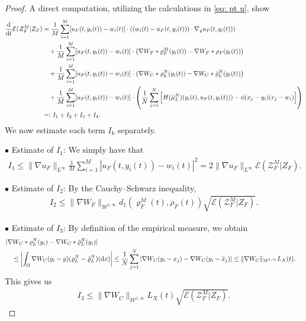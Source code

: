 \documentclass[10pt, reqno]{amsart}
\theoremstyle{definition}
\theoremstyle{remark}
\numberwithin{equation}{section}
\newcommand{\dx}{\textnormal{d}x}
\newcommand{\ddt}{\frac{\textnormal{d}}{\textnormal{d}t}}
\newcommand{\calE}{\mathcal E}
\newcommand{\calW}{\mathcal W}
\newcommand{\calZ}{\mathcal Z}
\begin{document}
\begin{proof}
A direct computation, utilizing the calculations in \eqref{eq: pt u}, show
\begin{align*}
   \ddt \calE(\calZ_F^M| Z_F)  
    &= \frac{1}{M}\sum_{i=1}^M [u_F(t,y_i(t))-w_i(t)]\cdot\left( (w_i(t) - u_F(t,y_i(t)) ) \cdot \nabla_y u_F(t,y_i(t))  \right)\\
    &\quad + \frac{1}{M}\sum_{i=1}^M [u_F(t,y_i(t)) - w_i(t)] \cdot \left(\nabla W_F * \varrho_F^M(y_i(t)) - \nabla W_F * \rho_F(y_i(t)) \right) \\
    &\quad + \frac{1}{M}\sum_{i=1}^M [u_F(t,y_i(t)) - w_i(t)] \cdot \left(\nabla W_C * \varrho_L^N(y_i(t)) - \nabla W_C * \bar \varrho_L^N(y_i(t)) \right) \\
    &\quad + \frac{1}{M}\sum_{i=1}^M [u_F(t,y_i(t)) - w_i(t)]\cdot \left(\frac{1}{N}\sum_{j=1}^N \Big[H(\bar{\mu}_L^N)(y_i(t),u_F(t,y_i(t))) - \phi(x_j-y_i)(v_j-w_i) \Big] \right)\\
    &=: I_1 + I_2 + I_3 + I_4. 
\end{align*}
We now estimate each term $I_k$ separately.


$\bullet$ Estimate of $I_1$: We simply have that
\begin{align*}
    I_1 \le \|\nabla u_F\|_{L^\infty} \frac{1}{M}\sum_{i=1}^M |u_F(t,y_i(t)) - w_i(t)|^2 = 2\|\nabla u_F\|_{L^\infty} \calE(\calZ_F^M| Z_F).
\end{align*}

$\bullet$ Estimate of $I_2$: By the Cauchy--Schwarz inequality,
\begin{align*}
    I_2 \le \|\nabla W_F\|_{\calW^{1,\infty}} d_1(\varrho_F^M(t), \rho_F(t)) \sqrt{\calE(\calZ_F^M| Z_F)} .
\end{align*}

$\bullet$ Estimate of $I_3$: By definition of the empirical measure, we obtain
\begin{align*}
    &|\nabla W_C *  \varrho_L^N (y_i) - \nabla W_C *  \bar \varrho_L^N(y_i)| \cr
    &\quad \le \left|\int_{\Omega} \nabla W_C(y_i-y) ( \varrho_L^N -  \bar\varrho_L^N)(\dx) \right| \le \frac1N\sum_{j=1}^N \left|\nabla W_C(y_i - x_j) - \nabla W_C(y_i - \bar x_j)\right| \le \|\nabla W_C\|_{\calW^{1,\infty}} L_X(t).
\end{align*}
This gives us
\begin{align*}
    I_3 \le \|\nabla W_C\|_{\calW^{1,\infty}} L_X(t) \sqrt{\calE(\calZ_F^M| Z_F)}.
\end{align*}


\end{proof}
\end{document}
